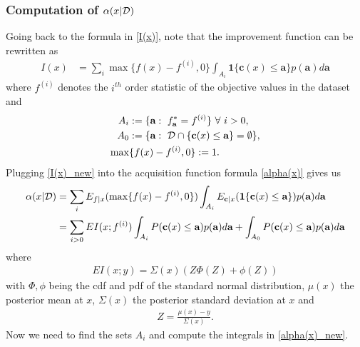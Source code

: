 \subsubsection{Computation of $\alpha(x|\mathcal{D})$}
Going back to the formula in \eqref{I(x)}, note that the improvement function can be rewritten as
\begin{align}\label{I(x)_new}
    I(x) &= \sum_i\max\{f(x)-f^{(i)},0\}\int_{A_i}\textbf{1}\{\textbf{c}(x)\le \textbf{a}\}p(\textbf{a})d\textbf{a}
\end{align}
where $f^{(i)}$ denotes the $i^{th}$ order statistic of the objective values in the dataset and
\begin{align}
    A_i &:= \{\textbf{a}:\ f^*_\textbf{a}=f^{(i)}\}\ \forall \ i>0,\\
    A_0 &:= \{\textbf{a}:\ \calD \cap \{\textbf{c}(x)\le \textbf{a}\}=\emptyset\},\\
    \max & \{f(x)-f^{(i)},0\}:= 1.
\end{align}
Plugging \eqref{I(x)_new} into the acquisition function formula \eqref{alpha(x)} gives us
\begin{align}
    \alpha(x|\mathcal{D}) &= \sum_iE_{f|x}(\max\{f(x)-f^{(i)},0\})\int_{A_i}E_{\textbf{c}|x}(\textbf{1}\{\textbf{c}(x)\le \textbf{a}\})p(\textbf{a})d\textbf{a}\\
    &= \sum_{i>0}EI(x;f^{(i)})\int_{A_i}P(\textbf{c}(x)\le \textbf{a})p(\textbf{a})d\textbf{a} + \int_{A_0}P(\textbf{c}(x)\le \textbf{a})p(\textbf{a})d\textbf{a} \label{alpha(x)_new}
\end{align}
where
\begin{align}
    EI(x;y) = \Sigma(x)(Z\Phi(Z)+\phi(Z))
\end{align}
with $\Phi,\phi$ being the cdf and pdf of the standard normal distribution, $\mu(x)$ the posterior mean at $x$, $\Sigma(x)$ the posterior standard deviation at $x$ and
\begin{align}
    Z = \frac{\mu(x)-y}{\Sigma(x)}.
\end{align}
Now we need to find the sets $A_i$ and compute the integrals in \eqref{alpha(x)_new}.
